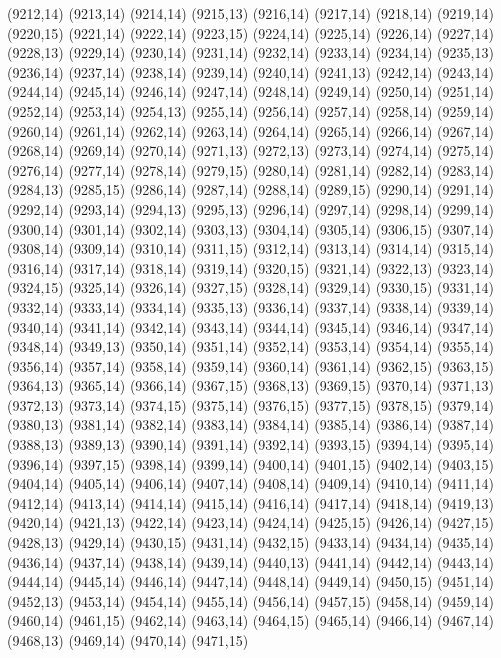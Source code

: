(9212,14)
(9213,14)
(9214,14)
(9215,13)
(9216,14)
(9217,14)
(9218,14)
(9219,14)
(9220,15)
(9221,14)
(9222,14)
(9223,15)
(9224,14)
(9225,14)
(9226,14)
(9227,14)
(9228,13)
(9229,14)
(9230,14)
(9231,14)
(9232,14)
(9233,14)
(9234,14)
(9235,13)
(9236,14)
(9237,14)
(9238,14)
(9239,14)
(9240,14)
(9241,13)
(9242,14)
(9243,14)
(9244,14)
(9245,14)
(9246,14)
(9247,14)
(9248,14)
(9249,14)
(9250,14)
(9251,14)
(9252,14)
(9253,14)
(9254,13)
(9255,14)
(9256,14)
(9257,14)
(9258,14)
(9259,14)
(9260,14)
(9261,14)
(9262,14)
(9263,14)
(9264,14)
(9265,14)
(9266,14)
(9267,14)
(9268,14)
(9269,14)
(9270,14)
(9271,13)
(9272,13)
(9273,14)
(9274,14)
(9275,14)
(9276,14)
(9277,14)
(9278,14)
(9279,15)
(9280,14)
(9281,14)
(9282,14)
(9283,14)
(9284,13)
(9285,15)
(9286,14)
(9287,14)
(9288,14)
(9289,15)
(9290,14)
(9291,14)
(9292,14)
(9293,14)
(9294,13)
(9295,13)
(9296,14)
(9297,14)
(9298,14)
(9299,14)
(9300,14)
(9301,14)
(9302,14)
(9303,13)
(9304,14)
(9305,14)
(9306,15)
(9307,14)
(9308,14)
(9309,14)
(9310,14)
(9311,15)
(9312,14)
(9313,14)
(9314,14)
(9315,14)
(9316,14)
(9317,14)
(9318,14)
(9319,14)
(9320,15)
(9321,14)
(9322,13)
(9323,14)
(9324,15)
(9325,14)
(9326,14)
(9327,15)
(9328,14)
(9329,14)
(9330,15)
(9331,14)
(9332,14)
(9333,14)
(9334,14)
(9335,13)
(9336,14)
(9337,14)
(9338,14)
(9339,14)
(9340,14)
(9341,14)
(9342,14)
(9343,14)
(9344,14)
(9345,14)
(9346,14)
(9347,14)
(9348,14)
(9349,13)
(9350,14)
(9351,14)
(9352,14)
(9353,14)
(9354,14)
(9355,14)
(9356,14)
(9357,14)
(9358,14)
(9359,14)
(9360,14)
(9361,14)
(9362,15)
(9363,15)
(9364,13)
(9365,14)
(9366,14)
(9367,15)
(9368,13)
(9369,15)
(9370,14)
(9371,13)
(9372,13)
(9373,14)
(9374,15)
(9375,14)
(9376,15)
(9377,15)
(9378,15)
(9379,14)
(9380,13)
(9381,14)
(9382,14)
(9383,14)
(9384,14)
(9385,14)
(9386,14)
(9387,14)
(9388,13)
(9389,13)
(9390,14)
(9391,14)
(9392,14)
(9393,15)
(9394,14)
(9395,14)
(9396,14)
(9397,15)
(9398,14)
(9399,14)
(9400,14)
(9401,15)
(9402,14)
(9403,15)
(9404,14)
(9405,14)
(9406,14)
(9407,14)
(9408,14)
(9409,14)
(9410,14)
(9411,14)
(9412,14)
(9413,14)
(9414,14)
(9415,14)
(9416,14)
(9417,14)
(9418,14)
(9419,13)
(9420,14)
(9421,13)
(9422,14)
(9423,14)
(9424,14)
(9425,15)
(9426,14)
(9427,15)
(9428,13)
(9429,14)
(9430,15)
(9431,14)
(9432,15)
(9433,14)
(9434,14)
(9435,14)
(9436,14)
(9437,14)
(9438,14)
(9439,14)
(9440,13)
(9441,14)
(9442,14)
(9443,14)
(9444,14)
(9445,14)
(9446,14)
(9447,14)
(9448,14)
(9449,14)
(9450,15)
(9451,14)
(9452,13)
(9453,14)
(9454,14)
(9455,14)
(9456,14)
(9457,15)
(9458,14)
(9459,14)
(9460,14)
(9461,15)
(9462,14)
(9463,14)
(9464,15)
(9465,14)
(9466,14)
(9467,14)
(9468,13)
(9469,14)
(9470,14)
(9471,15)
